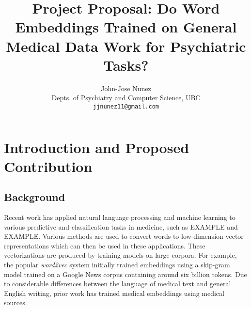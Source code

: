 \documentclass[10pt]{article}
\title{Project Proposal: Do Word Embeddings Trained on General Medical Data Work for Psychiatric Tasks?}
\author{John-Jose Nunez\\
  Depts. of Psychiatry and Computer Science, UBC\\
  {\tt jjnunez11@gmail.com} 
}
\date{}
\begin{document}
\maketitle

%

\section{Introduction and Proposed Contribution}

\subsection{Background}

Recent work has applied natural language processing and machine learning to various predictive and classification tasks in medicine, such as EXAMPLE and EXAMPLE. Various methods are used to convert words to low-dimension vector representations which can then be used in these applications. These vectorizations are produced by training models on large corpora. For example, the popular \emph{word2vec} system \cite{mikolovEfficientEstimationWord2013} initially trained embeddings using a skip-gram model trained on a Google News corpus containing around six billion tokens. Due to considerable differences between the language of medical text and general English writing, prior work has trained  medical embeddings using medical sources. 
\end{document}
